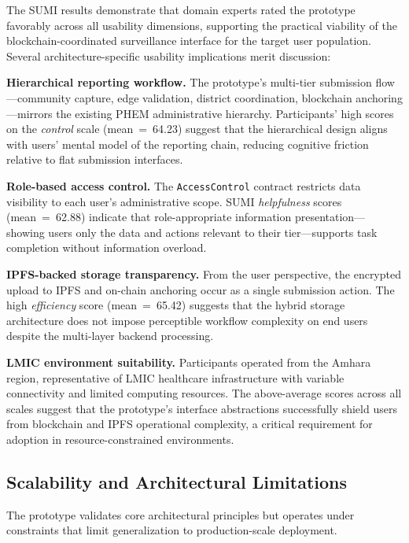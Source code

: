 The SUMI results demonstrate that domain experts rated the prototype favorably across all usability dimensions, supporting the practical viability of the blockchain-coordinated surveillance interface for the target user population. Several architecture-specific usability implications merit discussion:

\textbf{Hierarchical reporting workflow.} The prototype's multi-tier submission flow---community capture, edge validation, district coordination, blockchain anchoring---mirrors the existing PHEM administrative hierarchy. Participants' high scores on the \emph{control} scale (mean~=~64.23) suggest that the hierarchical design aligns with users' mental model of the reporting chain, reducing cognitive friction relative to flat submission interfaces.

\textbf{Role-based access control.} The \texttt{AccessControl} contract restricts data visibility to each user's administrative scope. SUMI \emph{helpfulness} scores (mean~=~62.88) indicate that role-appropriate information presentation---showing users only the data and actions relevant to their tier---supports task completion without information overload.

\textbf{IPFS-backed storage transparency.} From the user perspective, the encrypted upload to IPFS and on-chain anchoring occur as a single submission action. The high \emph{efficiency} score (mean~=~65.42) suggests that the hybrid storage architecture does not impose perceptible workflow complexity on end users despite the multi-layer backend processing.

\textbf{LMIC environment suitability.} Participants operated from the Amhara region, representative of LMIC healthcare infrastructure with variable connectivity and limited computing resources. The above-average scores across all scales suggest that the prototype's interface abstractions successfully shield users from blockchain and IPFS operational complexity, a critical requirement for adoption in resource-constrained environments.

\subsection{Scalability and Architectural Limitations}\label{subsec:scalability_eval}

The prototype validates core architectural principles but operates under constraints that limit generalization to production-scale deployment.

